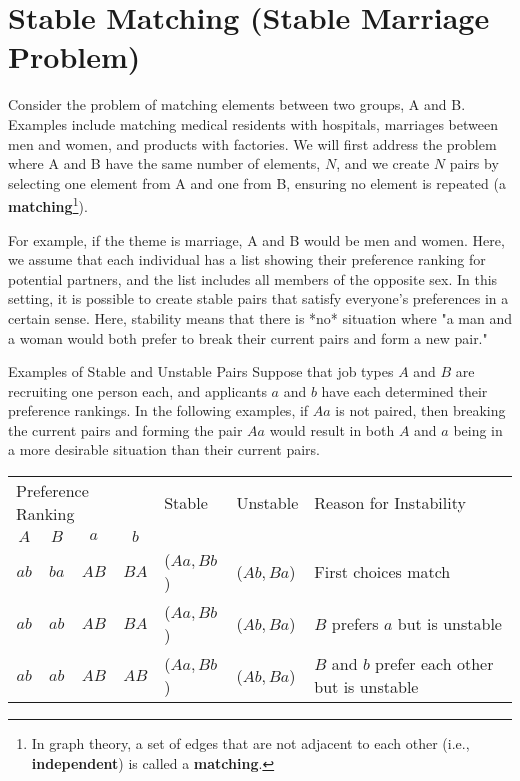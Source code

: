 \chapter{Stable Matching (Stable Marriage Problem)}

Consider the problem of matching elements between two groups, A and B. Examples include matching medical residents with hospitals, marriages between men and women, and products with factories. We will first address the problem where A and B have the same number of elements, $N$, and we create $N$ pairs by selecting one element from A and one from B, ensuring no element is repeated (a \textbf{matching}\footnote{In graph theory, a set of edges that are not adjacent to each other (i.e., \textbf{independent}) is called a \textbf{matching}.}).

For example, if the theme is marriage, A and B would be men and women. Here, we assume that each individual has a list showing their preference ranking for potential partners, and the list includes all members of the opposite sex. In this setting, it is possible to create stable pairs that satisfy everyone's preferences in a certain sense. Here, stability means that there is *no* situation where "a man and a woman would both prefer to break their current pairs and form a new pair."

\begin{itembox}{Examples of Stable and Unstable Pairs}
  Suppose that job types $A$ and $B$ are recruiting one person each, and applicants $a$ and $b$ have each determined their preference rankings. In the following examples, if $Aa$ is not paired, then breaking the current pairs and forming the pair $Aa$ would result in both $A$ and $a$ being in a more desirable situation than their current pairs.

  \begin{center}
  \begin{tabular}{cccc|lll}
    \multicolumn{4}{l|}{Preference Ranking} & Stable & Unstable & Reason for Instability\\
    $A$ & $B$ & $a$ & $b$ \\\hline
    $ab$&  $ba$& $AB$& $BA$   & ($Aa, Bb$) & ($Ab, Ba$) & First choices match\\
    $ab$&  $ab$& $AB$& $BA$   & ($Aa, Bb$) & ($Ab, Ba$)
    & $B$ prefers $a$ but is unstable\\
    $ab$&  $ab$& $AB$& $AB$   & ($Aa, Bb$) & ($Ab, Ba$)& $B$ and $b$ prefer each other but is unstable
  \end{tabular}
  \end{center}
\end{itembox}

